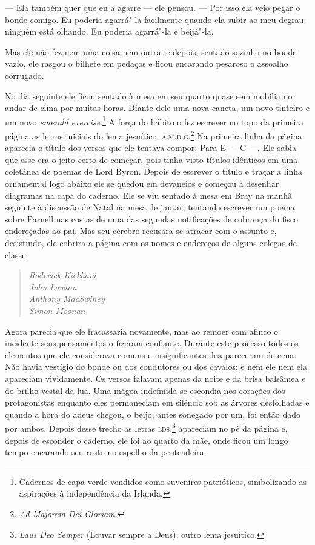  --- Ela também quer que eu a agarre --- ele pensou. --- Por isso ela veio pegar o
bonde comigo. Eu poderia agarrá"-la facilmente quando ela subir ao meu
degrau: ninguém está olhando. Eu poderia agarrá"-la e beijá"-la.

Mas ele não fez nem uma coisa nem outra: e depois, sentado sozinho no
bonde vazio, ele rasgou o bilhete em pedaços e ficou encarando pesaroso
o assoalho corrugado.

No dia seguinte ele ficou sentado à mesa em seu quarto quase sem mobília
no andar de cima por muitas horas. Diante dele uma nova caneta, um novo
tinteiro e um novo \textit{emerald exercise}.\footnote{ Cadernos de capa
verde vendidos como suvenires patrióticos, simbolizando as aspirações à 
independência da Irlanda.} A força do hábito o fez escrever no topo da
primeira página as letras iniciais do lema jesuítico: \textsc{a.m.d.g.}\footnote{
\textit{Ad Majorem Dei Gloriam.}} Na primeira linha da página aparecia o título dos versos
que ele tentava compor: Para E --- C ---. Ele sabia que esse era o jeito
certo de começar, pois tinha visto títulos idênticos em uma coletânea
de poemas de Lord Byron. Depois de escrever o título e traçar a linha
ornamental logo abaixo ele se quedou em devaneios e começou a desenhar
diagramas na capa do caderno. Ele se viu sentado à mesa em Bray na
manhã seguinte à discussão de Natal na mesa de jantar, tentando
escrever um poema sobre Parnell nas costas de uma das segundas
notificações de cobrança do fisco endereçadas ao pai. Mas seu cérebro
recusara se atracar com o assunto e, desistindo, ele cobrira a página
com os nomes e endereços de alguns colegas de classe:

\begin{verse}\itshape
Roderick Kickham\\
John Lawton\\
Anthony MacSwiney\\
Simon Moonan
\end{verse}

Agora parecia que ele fracassaria novamente, mas ao remoer com afinco o
incidente seus pensamentos o fizeram confiante. Durante este processo
todos os elementos que ele considerava comuns e insignificantes
desapareceram de cena. Não havia vestígio do bonde ou dos condutores ou
dos cavalos: e nem ele nem ela apareciam vividamente. Os versos falavam
apenas da noite e da brisa balsâmea e do brilho vestal da lua. 	
Uma mágoa indefinida se escondia nos corações dos protagonistas
enquanto eles permaneciam em silêncio sob as árvores desfolhadas e
quando a hora do adeus chegou, o beijo, antes sonegado por um, foi
então dado por ambos. Depois desse trecho as letras \textsc{lds}.\footnote{
\textit{Laus Deo Semper} (Louvar sempre a Deus), outro lema jesuítico.}
apareciam no pé da página e, depois de esconder o caderno, ele foi ao
quarto da mãe, onde ficou um longo tempo encarando seu rosto no espelho
da penteadeira.

